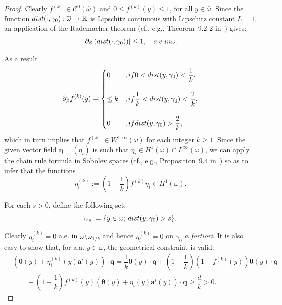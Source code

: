 \documentclass{amsart}
\begin{document}
\begin{proof}
	Clearly $f^{(k)} \in \mathcal{C}^0(\overline{\omega})$ and $0\le f^{(k)}(y)\le 1$, for all $y\in\overline{\omega}$. Since the function $\textup{dist}(\cdot,\gamma_0):\overline{\omega} \to \mathbb{R}$ is Lipschitz continuous with Lipschitz constant $L=1$, an application of the Rademacher theorem (cf., e.g., Theorem~9.2-2 in~\cite{Ciarlet2025}) gives:
	\begin{equation*}
		\left|\partial_\beta\left(\textup{dist}(\cdot,\gamma_0)\right)\right|\le 1,\quad\textup{ a.e. in }\omega.
	\end{equation*}
	
	As a result
	\begin{equation*}
		\partial_\beta f^{(k)}(y)=
		\begin{cases}
			0&,\textup{ if }0< \textup{dist}(y,\gamma_0)< \dfrac{1}{k},\\
			\\
			\le k&,\textup{ if }\dfrac{1}{k}< \textup{dist}(y,\gamma_0)<\dfrac{2}{k},\\
			\\
			0&,\textup{ if }\textup{dist}(y,\gamma_0)>\dfrac{2}{k},
		\end{cases}
	\end{equation*}
	which in turn implies that $f^{(k)}\in W^{1,\infty}(\omega)$ for each integer $k\ge 1$. Since the given vector field $\bm{\eta}=(\eta_i)$ is such that $\eta_i\in H^1(\omega)\cap L^\infty(\omega)$, we can apply the chain rule formula in Sobolev spaces (cf., e.g., Proposition~9.4 in~\cite{Brez11}) so as to infer that the functions
	\begin{equation*}
		\eta_i^{(k)}:=\left(1-\dfrac{1}{k}\right)f^{(k)}\eta_i \in H^1(\omega).
	\end{equation*}
	
	For each $s>0$, define the following set:
	\begin{equation*}
		\omega_s:=\{y\in\omega;\,\textup{dist}(y,\gamma_0)>s\}.
	\end{equation*}
	
	Clearly $\eta_i^{(k)}=0$ a.e. in $\omega\setminus\overline{\omega_{1/k}}$ and hence $\eta_i^{(k)}=0$ on $\gamma_0$ \emph{a fortiori}.
	It is also easy to show that, for a.a. $y\in\omega$, the geometrical constraint is valid:
	\begin{equation*}
		\begin{aligned}
			&(\bm{\theta}(y)+\eta_i^{(k)}(y)\bm{a}^{i}(y))\cdot\bm{q}=\dfrac{1}{k}\bm{\theta}(y)\cdot\bm{q}+\left(1-\dfrac{1}{k}\right)\left(1-f^{(k)}(y)\right)\bm{\theta}(y)\cdot\bm{q}\\
			&\qquad+\left(1-\dfrac{1}{k}\right)f^{(k)}(y)(\bm{\theta}(y)+\eta_i(y)\bm{a}^i(y))\cdot\bm{q}\ge \dfrac{d}{k}>0.
		\end{aligned}
	\end{equation*}
	

\end{proof}
\end{document}
